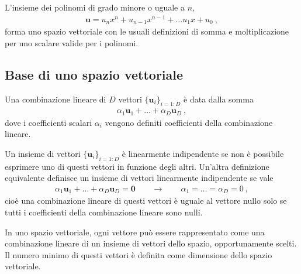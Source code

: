 \documentclass[letterpaper,10pt,italian]{jupyterBook}
\begin{document}
\sphinxAtStartPar
{}

\sphinxAtStartPar
{} L’insieme dei polinomi di grado minore o uguale a \(n\),
\begin{equation*}
\begin{split}\mathbf{u} = u_n x^n + u_{n-1} x^{n-1} + \dots u_1 x + u_0 \ ,\end{split}
\end{equation*}
\sphinxAtStartPar
forma uno spazio vettoriale con le usuali definizioni di somma e moltiplicazione per uno scalare valide per i polinomi.


\subsection{Base di uno spazio vettoriale}
\label{\detokenize{ch/algebra/vector-algebra-def:base-di-uno-spazio-vettoriale}}
\sphinxAtStartPar
{} Una combinazione lineare di \(D\) vettori \(\{ \mathbf{u}_i \}_{i=1:D}\) è data dalla somma
\begin{equation*}
\begin{split}\alpha_1 \mathbf{u}_1 + \dots + \alpha_D \mathbf{u}_D \ ,\end{split}
\end{equation*}
\sphinxAtStartPar
dove i coefficienti scalari \(\alpha_i\) vengono definiti coefficienti della combinazione lineare.

\sphinxAtStartPar
{} Un insieme di vettori \(\{ \mathbf{u}_i \}_{i=1:D}\) è linearmente indipendente se non è possibile esprimere uno di questi vettori in funzione degli altri. Un’altra definizione equivalente definisce un insieme di vettori linearmente indipendente se vale
\begin{equation*}
\begin{split}\alpha_1 \mathbf{u}_1 + \dots + \alpha_D \mathbf{u}_D = \mathbf{0} \qquad \rightarrow \qquad \alpha_1 = \dots = \alpha_D = 0 \ ,\end{split}
\end{equation*}
\sphinxAtStartPar
cioè una combinazione lineare di questi vettori è uguale al vettore nullo solo se tutti i coefficienti della combinazione lineare sono nulli.

\sphinxAtStartPar
{} In uno spazio vettoriale, ogni vettore può essere rappresentato come una combinazione lineare di un insieme di vettori dello spazio, opportunamente scelti. Il numero minimo di questi vettori è definita come dimensione dello spazio vettoriale.
\end{document}
